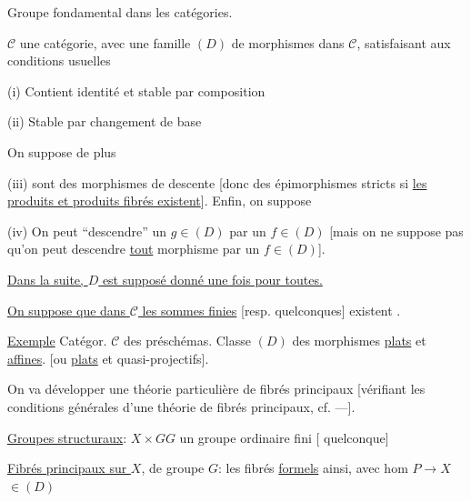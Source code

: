 Groupe fondamental dans les catégories.

$\mathcal C$ une catégorie, avec une famille $(D)$ de morphismes dans $\mathcal C$, satisfaisant aux conditions usuelles

(i) Contient identité et stable par composition

(ii) Stable par changement de base

On suppose de plus

(iii)   sont des morphismes de descente [donc des épimorphismes stricts  si  \uline{les produits et produits fibrés existent}].
Enfin, on suppose



(iv) On peut ``descendre'' un $g\in(D)$ par un $f\in(D)$
[mais on ne suppose pas qu'on peut descendre \uline{tout} morphisme par un $f\in(D)$].

\uline{Dans la suite, $D$ est supposé donné une fois pour toutes.}

\uline{On suppose que dans $\mathcal C$ les sommes finies} [resp. quelconques] existent
.


\uline{Exemple}
Catégor. $\mathcal C$ des préschémas. 
Classe $(D)$ des morphismes \uline{plats} et \uline{affines}.
[ou \uline{plats} et quasi-projectifs].

On va développer une théorie particulière de fibrés principaux [vérifiant les conditions générales  d'une théorie de fibrés principaux, cf. ---].

\uline{Groupes structuraux}: $X\times G$\qquad $G$ un groupe ordinaire fini [ quelconque]

\uline{Fibrés principaux  sur $X$}, de groupe $G$: les fibrés \uline{formels} ainsi, avec hom $P\to X$ $\in(D)$
